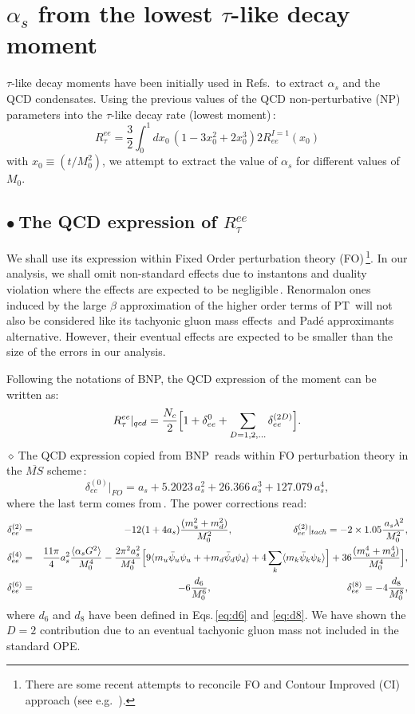 \documentclass[review]{elsarticle}
\def\beq{\begin{equation}}
\def\eeq{\end{equation}}
\def\bea{\begin{eqnarray}}
\def\eea{\end{eqnarray}}
\def\nnb{\nonumber}
\def\nnb{\nonumber}
\def\la{\langle}
\def\ra{\rangle}
\def\b{$\bullet~$}
\def\d{$\diamond~$}
\begin{document}
  \section{$\alpha_s$ from the lowest $\tau$-like decay moment}
  $\tau$-like decay moments have been initially used in Refs.\,\cite{SNPICH,SN95} to extract $\alpha_s$ and the QCD condensates. 
  Using the previous values of the QCD non-perturbative (NP) parameters into the $\tau$-like decay rate (lowest moment)\,\cite{BNP}:
  \beq
  R^{ee}_{\tau}=\frac{3}{2}\int_0^{1} dx_0\, (1-3x_0^2+2x_0^3)2R^{I=1}_{ee}(x_0)
  \eeq
  with $x_0\equiv (t/M^2_0)$, we attempt to extract the value of $\alpha_s$ for different values of $M_0$.
  \subsection*{\b The QCD expression of $ R^{ee}_{\tau}$}
 We shall use its expression  within Fixed Order perturbation theory (FO)\,\footnote{There are some recent attempts to reconcile FO and Contour Improved (CI) approach (see e.g. \,\cite{JAMIN}).}. In our analysis, we shall omit non-standard effects due to  instantons and duality violation where the effects are expected to be negligible\,\cite{PICH2,SNTAU}.  Renormalon ones induced by the large $\beta$ approximation of the higher order terms of PT\,\cite{RENORM,AYALA} will not also be considered like its tachyonic gluon mass effects\,\cite{ZAKA} and Pad\'e approximants alternative. However, their eventual effects are expected to be smaller than the size of the errors in our analysis. 
  
  Following the notations of BNP, the QCD expression of the moment can be written as:
  \beq
  R^{ee}_{\tau}\vert_{qcd}= \frac{N_c}{2}\Big{[} 1+\delta_{ee}^{0}+\sum_{D=1,2,\dots}\delta_{ee}^{(2D)}\Big{]}.
  \eeq
 \d The QCD expression copied from BNP\,\cite{BNP} reads within FO perturbation theory in the $\overline{MS}$ scheme\,:
  \beq
  \delta^{(0)}_{ee}\vert_{FO}=a_s+5.2023\,a_s^2+26.366\,a_s^3+ 127.079\,a_s^4,
  \eeq
  where the last term comes from\,\cite{CHET4}.  The power corrections read:
  \bea
   \delta^{(2)}_{ee}&=&-12(1+4a_s)\frac{(m_u^2+m_d^2)}{M_0^2},\,\,\,\,\,\,\,\,\,\,\,\,\,\,\,\,\,\,\,\,\,\,\,\,\,\,\,\,\,\,\,\,\,\,\,\,\,
   \delta^{(2)}_{ee}\vert_{tach}=-2\times 1.05\frac{\,a_s\lambda^2}{M_0^2},\nnb\\
   \delta^{(4)}_{ee}&=&\frac{11\pi}{4}a_s^2\frac{\la\alpha_s G^2\ra}{M_0^4}
  -\frac{2\pi^2a_s^2}{M_0^4}\Big{[} 9\la m_u\bar \psi_u\psi_u++m_d\bar\psi_d\psi_d \ra+4\sum_k \la m_k\bar \psi_k\psi_k\ra\Big{]}+36\frac{(m_u^4+m_d^4)}{M_0^4}\Big{]},\nnb\\
   \delta^{(6)}_{ee}&=& -6\frac{d_6}{M_0^6},\,\,\,\,\,\,\,\,\,\,\,\,\,\,\,\,\,\,\,\,\,\,\,\,\,\,\,\,\,\,\,\,\,\,\,\,\,\,\,\,\,\,\,\,\,\,\,\,\,\,\,\,\,\,\,\,\,\,\,\,\,\,\,\,\,\,\,\,\,\,\,\,\,\,\,\,\,\,\,\,\,\,\,
   \delta_{ee}^{(8)}= -4\frac{d_8}{M_0^8},
  \eea
  where $d_{6}$ and $d_{8}$ have been defined in Eqs.\,\ref{eq:d6} and \ref{eq:d8}. We have shown the $D=2$ contribution due to an eventual tachyonic gluon mass not included in the standard OPE. 
  
\end{document}
